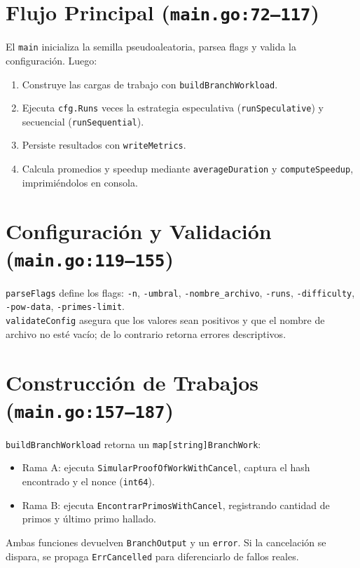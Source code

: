 \documentclass[11pt]{article}
\begin{document}
\section{Flujo Principal (\texttt{main.go:72--117})}
El \texttt{main} inicializa la semilla pseudoaleatoria, parsea flags y valida la configuración. Luego:
\begin{enumerate}
  \item Construye las cargas de trabajo con \texttt{buildBranchWorkload}.
  \item Ejecuta \texttt{cfg.Runs} veces la estrategia especulativa (\texttt{runSpeculative}) y secuencial (\texttt{runSequential}).
  \item Persiste resultados con \texttt{writeMetrics}.
  \item Calcula promedios y speedup mediante \texttt{averageDuration} y \texttt{computeSpeedup}, imprimiéndolos en consola.
\end{enumerate}

\section{Configuración y Validación (\texttt{main.go:119--155})}
\texttt{parseFlags} define los flags:
\texttt{-n}, \texttt{-umbral}, \texttt{-nombre\_archivo}, \texttt{-runs}, \texttt{-difficulty}, \texttt{-pow-data}, \texttt{-primes-limit}.\\
\texttt{validateConfig} asegura que los valores sean positivos y que el nombre de archivo no esté vacío; de lo contrario retorna errores descriptivos.

\section{Construcción de Trabajos (\texttt{main.go:157--187})}
\texttt{buildBranchWorkload} retorna un \texttt{map[string]BranchWork}:
\begin{itemize}
  \item Rama A: ejecuta \texttt{SimularProofOfWorkWithCancel}, captura el hash encontrado y el nonce (\texttt{int64}).
  \item Rama B: ejecuta \texttt{EncontrarPrimosWithCancel}, registrando cantidad de primos y último primo hallado.
\end{itemize}
Ambas funciones devuelven \texttt{BranchOutput} y un \texttt{error}. Si la cancelación se dispara, se propaga \texttt{ErrCancelled} para diferenciarlo de fallos reales.
\end{document}
